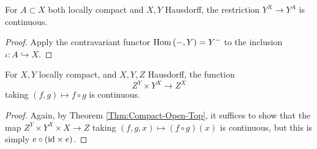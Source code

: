 \begin{corollary}
    For $A \subset X$ both locally compact and $X,Y$ Hausdorff,
    the restriction $Y^{X} \to Y^{A}$ is continuous.
\end{corollary}

\begin{proof}
    Apply the contravariant functor
    $\operatorname{Hom} \left( -,Y \right) = 
    Y^{-}$ to the inclusion $\iota \colon A \hookrightarrow X$.
\end{proof}

\begin{theorem}[]
    For $X,Y$ locally compact, and $X,Y,Z$ Hausdorff, the
    function
    \[
    Z^{Y} \times Y^{X} \to Z^{X}
    \] 
    taking $\left( f,g \right) \mapsto f \circ g$ is continuous.
\end{theorem}

\begin{proof}
    Again, by Theorem \ref{Thm:Compact-Open-Top}, it
    suffices to show that the map
    $Z^{Y} \times Y^{X} \times X \to Z$ taking
    $\left( f,g,x \right) \mapsto \left( f \circ g \right) (x)$ 
    is continuous, but this is simply 
    $e \circ \left( {\mathrm{id}} \times e \right) $.
\end{proof}

